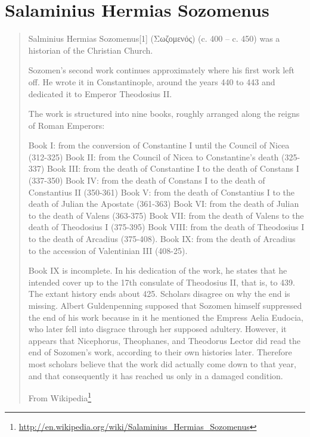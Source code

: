 \documentclass[12pt,letterpaper,twoside,final]{memoir}
\begin{document}
\section{Salaminius Hermias Sozomenus}
\blockquote[From Wikipedia\footnote{\url{http://en.wikipedia.org/wiki/Salaminius_Hermias_Sozomenus}}]{Salminius Hermias Sozomenus[1] (Σωζομενός) (c. 400 – c. 450) was a historian of the Christian Church.

Sozomen's second work continues approximately where his first work left off. He wrote it in Constantinople, around the years 440 to 443 and dedicated it to Emperor Theodosius II.

The work is structured into nine books, roughly arranged along the reigns of Roman Emperors:

    Book I: from the conversion of Constantine I until the Council of Nicea (312-325)
    Book II: from the Council of Nicea to Constantine's death (325-337)
    Book III: from the death of Constantine I to the death of Constans I (337-350)
    Book IV: from the death of Constans I to the death of Constantius II (350-361)
    Book V: from the death of Constantius I to the death of Julian the Apostate (361-363)
    Book VI: from the death of Julian to the death of Valens (363-375)
    Book VII: from the death of Valens to the death of Theodosius I (375-395)
    Book VIII: from the death of Theodosius I to the death of Arcadius (375-408).
    Book IX: from the death of Arcadius to the accession of Valentinian III (408-25).

Book IX is incomplete. In his dedication of the work, he states that he intended cover up to the 17th consulate of Theodosius II, that is, to 439. The extant history ends about 425. Scholars disagree on why the end is missing. Albert Guldenpenning supposed that Sozomen himself suppressed the end of his work because in it he mentioned the Empress Aelia Eudocia, who later fell into disgrace through her supposed adultery. However, it appears that Nicephorus, Theophanes, and Theodorus Lector did read the end of Sozomen's work, according to their own histories later. Therefore most scholars believe that the work did actually come down to that year, and that consequently it has reached us only in a damaged condition.}
\end{document}
